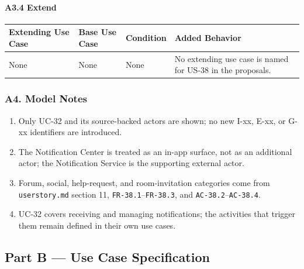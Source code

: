 \documentclass[12pt]{article}
\renewcommand{\baselinestretch}{1.5}
\begin{document}
\hypertarget{sec:a3-4-extend}{}
\paragraph*{A3.4 Extend}
\par\medskip

\begingroup
\small
\renewcommand{\baselinestretch}{1.0}\selectfont
\renewcommand{\arraystretch}{1.15}
\setlength{\tabcolsep}{6pt}
\begin{longtable}{|>{\raggedright\arraybackslash}p{}|>{\raggedright\arraybackslash}p{}|>{\raggedright\arraybackslash}p{}|>{\raggedright\arraybackslash}p{}|}
\hline
\textbf{Extending Use Case} & \textbf{Base Use Case} & \textbf{Condition} & \textbf{Added Behavior} \\ \hline
\endhead
None & None & None & No extending use case is named for US-38 in the proposals. \\ \hline
\end{longtable}
\endgroup
\par\medskip

\hypertarget{sec:a4-model-notes}{}
\subsubsection*{A4. Model Notes}
\par\medskip

\begin{enumerate}
\item Only UC-32 and its source-backed actors are shown; no new I-xx, E-xx, or G-xx identifiers are introduced.
\item The Notification Center is treated as an in-app surface, not as an additional actor; the Notification Service is the supporting external actor.
\item Forum, social, help-request, and room-invitation categories come from \texttt{userstory.md} section 11, \texttt{FR-38.1}--\texttt{FR-38.3}, and \texttt{AC-38.2}--\texttt{AC-38.4}.
\item UC-32 covers receiving and managing notifications; the activities that trigger them remain defined in their own use cases.
\end{enumerate}
\par\medskip

\hypertarget{sec:part-b-use-case-specification}{}
\subsection*{Part B --- Use Case Specification}
\par\medskip
\end{document}
